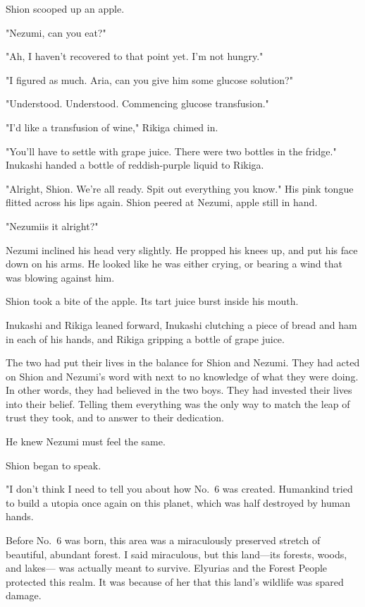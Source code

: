 Shion scooped up an apple.

"Nezumi, can you eat?"

"Ah, I haven't recovered to that point yet. I'm not hungry."

"I figured as much. Aria, can you give him some glucose solution?"

{\sffamily "Understood. Understood. Commencing glucose transfusion."}

"I'd like a transfusion of wine," Rikiga chimed in.

"You'll have to settle with grape juice. There were two bottles in the
fridge." Inukashi handed a bottle of reddish-purple liquid to Rikiga.

"Alright, Shion. We're all ready. Spit out everything you know." His
pink tongue flitted across his lips again. Shion peered at Nezumi, apple
still in hand.

"Nezumi\el is it alright?"

Nezumi inclined his head very slightly. He propped his knees up, and put
his face down on his arms. He looked like he was either crying, or
bearing a wind that was blowing against him.

Shion took a bite of the apple. Its tart juice burst inside his mouth.

Inukashi and Rikiga leaned forward, Inukashi clutching a piece of bread
and ham in each of his hands, and Rikiga gripping a bottle of grape
juice.

The two had put their lives in the balance for Shion and Nezumi. They
had acted on Shion and Nezumi's word with next to no knowledge of what
they were doing. In other words, they had believed in the two boys. They
had invested their lives into their belief. Telling them everything was
the only way to match the leap of trust they took, and to answer to
their dedication.

He knew Nezumi must feel the same.

Shion began to speak.

\mybreak

"I don't think I need to tell you about how No.~6 was created. Humankind
tried to build a utopia once again on this planet, which was half
destroyed by human hands.

Before No.~6 was born, this area was a miraculously preserved stretch of
beautiful, abundant forest. I said miraculous, but this land---its
forests, woods, and lakes--- was actually meant to survive. Elyurias and
the Forest People protected this realm. It was because of her that this
land's wildlife was spared damage.


